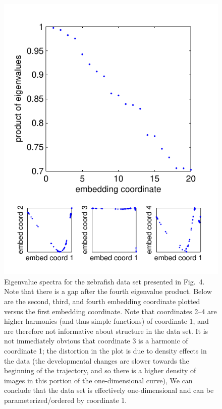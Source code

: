 \documentclass[10pt,twocolumn]{article}
\newcommand{\fig}[0]{Fig.}
\begin{document}
\begin{figure}
\includegraphics{figS4}
\caption{Eigenvalue spectra for the zebrafish data set presented in \fig~4. Note that there is a gap after the fourth eigenvalue product. Below are the second, third, and fourth embedding coordinate plotted versus the first embedding coordinate. Note that coordinates 2--4 are higher harmonics (and thus simple functions) of coordinate 1, and are therefore not informative about structure in the data set.  It is not immediately obvious that coordinate 3 is a harmonic of coordinate 1; the distortion in the plot is due to density effects in the data (the developmental changes are slower towards the beginning of the trajectory, and so there is a higher density of images in this portion of the one-dimensional curve), We can conclude that the data set is effectively one-dimensional and can be parameterized/ordered by coordinate 1.}
\end{figure}
\end{document}
